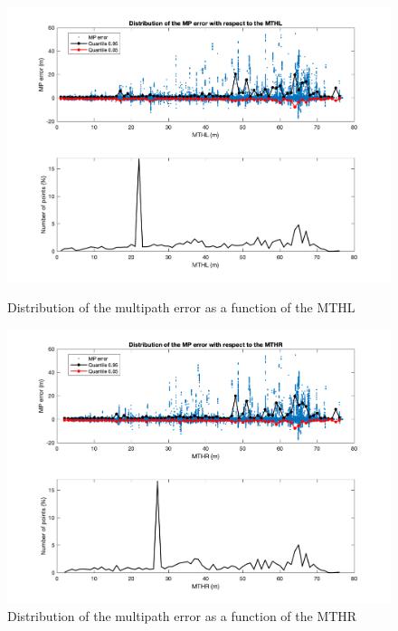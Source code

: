 \documentclass[a4paper, report, oneside, UKenglish]{memoir}
\begin{document}
\begin{figure}[htb]
  \centering
  \begin{minipage}[b]{0.49\textwidth}
    \includegraphics[width=\textwidth]{data-analysis/mpn_maxtopol.png}
    \caption{Distribution of the multipath error as a function of the MTHL}
    \label{fig:mpn_mthl}
  \end{minipage}
  \hfill
  \begin{minipage}[b]{0.49\textwidth}
    \includegraphics[width=\textwidth]{data-analysis/mpn_maxtopor.png}
    \caption{Distribution of the multipath error as a function of the MTHR}
    \label{fig:mpn_mthr}
  \end{minipage}
\end{figure}
\end{document}

